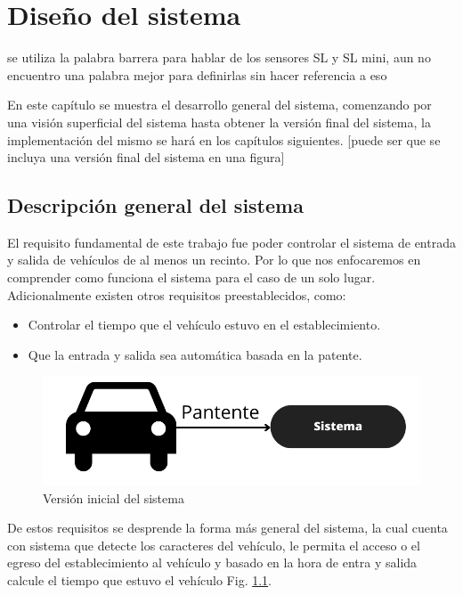 \chapter{Diseño del sistema}

 {\huge se utiliza la palabra barrera para hablar de los sensores SL y SL mini, aun no encuentro una palabra mejor para definirlas sin hacer referencia a eso}

En este capítulo se muestra el desarrollo general del sistema, comenzando por una visión superficial del sistema hasta obtener la versión final del sistema, la implementación del mismo se hará en los capítulos siguientes. [puede ser que se incluya una versión final del sistema en una figura]
\section{Descripción general del sistema}

El requisito fundamental de este trabajo fue poder controlar el sistema de entrada y salida de vehículos de al menos un recinto. Por lo que nos enfocaremos en comprender como funciona el sistema para el caso de un solo lugar. Adicionalmente existen otros requisitos preestablecidos, como:

\begin{itemize}
    \item Controlar el tiempo que el vehículo estuvo en el establecimiento.
    \item Que la entrada y salida sea automática basada en la patente.
\end{itemize}


\begin{figure}
    \centering
    \includegraphics[width=.8\textwidth]{imgs/sistema-base.png}
    \caption{Versión inicial del sistema}
    \label{fig:sistema-base}
\end{figure}

De estos requisitos se desprende la forma más general del sistema, la cual cuenta con sistema que detecte los caracteres del vehículo, le permita el acceso o el egreso del establecimiento al vehículo y basado en la hora de entra y salida calcule el tiempo que estuvo el vehículo Fig. \ref{fig:sistema-base}.


